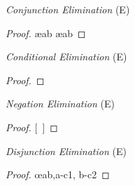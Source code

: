 \documentclass[a4paper, 11pt]{article} %
\begin{document}
\begin{multicols}{2}
\vfill\null
\columnbreak


\textit{Conjunction Elimination} (\eand E) \vspace{-1em}

\begin{proof}
	 \ae{ab}
	 \ae{ab}
\end{proof}

\vspace{0.75em}

\textit{Conditional Elimination} (\eif E)  \vspace{-1em}

\begin{proof}
	 
\end{proof}

\vspace{0.45em}

\textit{Negation Elimination} (\enot E)  \vspace{-1em}

\begin{proof}
\open
	 
	\ellipsesline
	\metaB{}
\close
{}[\ ]\metaA{}
\end{proof}

\vspace{1em}

\textit{Disjunction Elimination} (\eor E)  \vspace{-1em}

\begin{proof}
	\open
		 
	\close
\breakline
	\open
		 
	\close
	 \oe{ab,a-c1, b-c2}
\end{proof}

\fi




\end{multicols}
\end{document}
